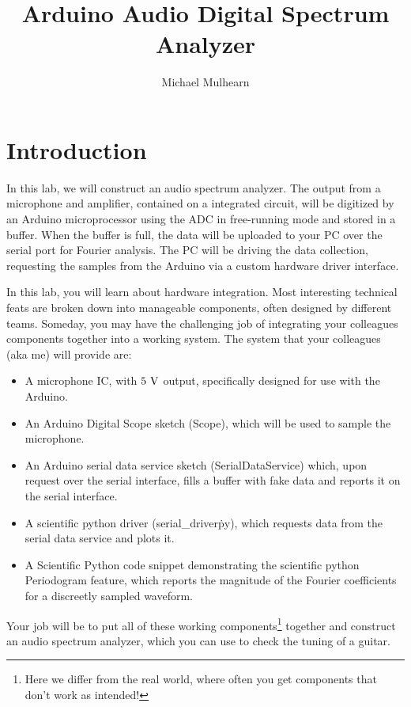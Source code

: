 \documentclass[12pt]{article}
\begin{document}
\title{Arduino Audio Digital Spectrum Analyzer}
\author{Michael Mulhearn}

\maketitle

\section{Introduction}

In this lab, we will construct an audio spectrum analyzer.  The output from a microphone and amplifier, contained on a integrated circuit, will be digitized by an Arduino microprocessor using the ADC in free-running mode and stored in a buffer.  When the buffer is full, the data will be uploaded to your PC over the serial port for Fourier analysis.  The PC will be driving the data collection, requesting the samples from the Arduino via a custom hardware driver interface.

In this lab, you will learn about hardware integration.  Most interesting technical feats are broken down into manageable components, often designed by different teams.  Someday, you may have the challenging job of integrating your colleagues components together into a working system.   The system that your colleagues (aka me) will provide are:
\begin{itemize}
\item A microphone IC, with $5~\rm V$ output, specifically designed for use with the Arduino.
\item An Arduino Digital Scope sketch (Scope), which will be used to sample the microphone.
\item An Arduino serial data service sketch (SerialDataService) which, upon request over the serial interface, fills a buffer with fake data and reports it on the serial interface.
\item A scientific python driver (serial\_driver\.py), which requests data from the serial data service and plots it.
\item A Scientific Python code snippet demonstrating the scientific python Periodogram feature, which reports the magnitude of the Fourier coefficients for a discreetly sampled waveform.
\end{itemize}
Your job will be to put all of these working components\footnote{Here we differ from the real world, where often you get components that don't work as intended!} together and construct an audio spectrum analyzer, which you can use to check the tuning of a guitar. 
\end{document}
